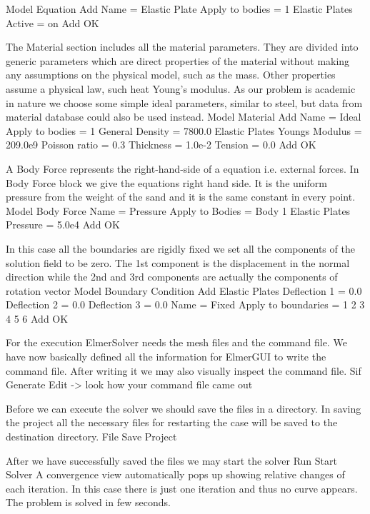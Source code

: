 \ttbegin
Model
  Equation
    Add 
      Name = Elastic Plate
      Apply to bodies = 1
      Elastic Plates
        Active = on           
    Add  
    OK
\ttend        

The Material section includes all the material parameters.
They are divided into generic parameters which are direct properties of the material
without making any assumptions on the physical model, such as the mass. Other properties assume
a physical law, such heat Young's modulus. As our problem is academic in nature we choose some 
simple ideal parameters, similar to steel, but data from material database could also be used instead.
\ttbegin
Model
  Material
    Add 
      Name = Ideal
      Apply to bodies = 1 
      General    
        Density = 7800.0
      Elastic Plates
        Youngs Modulus = 209.0e9
        Poisson ratio = 0.3
        Thickness = 1.0e-2
        Tension = 0.0	
      Add
      OK
\ttend

A Body Force represents the right-hand-side of a equation i.e. 
external forces. In Body Force block we give the equations right hand side. 
It is the uniform pressure from the weight of the sand and it is 
the same constant in every point.
\ttbegin
Model
  Body Force
    Name = Pressure
    Apply to Bodies = Body 1 
    Elastic Plates 
      Pressure = 5.0e4
    Add
    OK
\ttend


In this case all the boundaries are rigidly fixed we set all the components of the 
solution field to be zero. The 1st component is the displacement in the normal direction
while the 2nd and 3rd components  are actually the components of rotation vector
\ttbegin
Model
  Boundary Condition
    Add 
      Elastic Plates
        Deflection 1 = 0.0
        Deflection 2 = 0.0
        Deflection 3 = 0.0
      Name = Fixed
      Apply to boundaries = 1 2 3 4 5 6
      Add
      OK
\ttend   

For the execution ElmerSolver needs the mesh files and the command file. 
We have now basically defined all the information for ElmerGUI to write 
the command file. After writing it we may also visually inspect the command file.
\ttbegin
Sif 
  Generate
  Edit -> look how your command file came out  
\ttend

Before we can execute the solver we should save the files in a directory. In saving the project all the
necessary files for restarting the case will be saved to the destination directory.
\ttbegin
File 
  Save Project
\ttend

After we have successfully saved the files we may start the solver
\ttbegin
Run
  Start Solver
\ttend
A convergence view automatically pops up showing relative changes 
of each iteration.  In this case there is just one iteration and thus 
no curve appears.  The problem is solved in few seconds.

